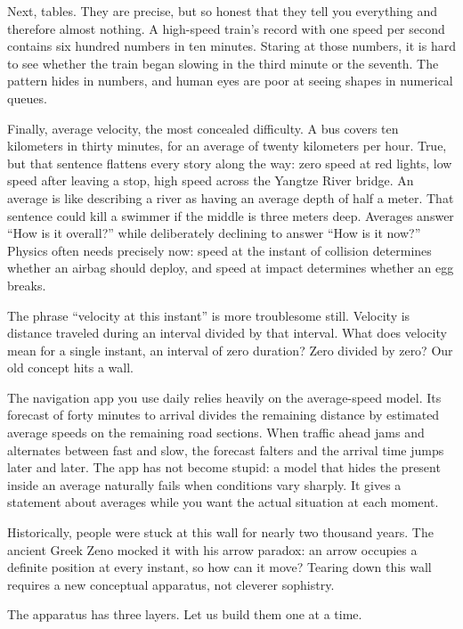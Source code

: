 Next, tables. They are precise, but so honest that they tell you everything and therefore almost nothing. A high-speed train's record with one speed per second contains six hundred numbers in ten minutes. Staring at those numbers, it is hard to see whether the train began slowing in the third minute or the seventh. The pattern hides in numbers, and human eyes are poor at seeing shapes in numerical queues.

Finally, average velocity, the most concealed difficulty. A bus covers ten kilometers in thirty minutes, for an average of twenty kilometers per hour. True, but that sentence flattens every story along the way: zero speed at red lights, low speed after leaving a stop, high speed across the Yangtze River bridge. An average is like describing a river as having an average depth of half a meter. That sentence could kill a swimmer if the middle is three meters deep. Averages answer ``How is it overall?'' while deliberately declining to answer ``How is it now?'' Physics often needs precisely now: speed at the instant of collision determines whether an airbag should deploy, and speed at impact determines whether an egg breaks.

The phrase ``velocity at this instant'' is more troublesome still. Velocity is distance traveled during an interval divided by that interval. What does velocity mean for a single instant, an interval of zero duration? Zero divided by zero? Our old concept hits a wall.

The navigation app you use daily relies heavily on the average-speed model. Its forecast of forty minutes to arrival divides the remaining distance by estimated average speeds on the remaining road sections. When traffic ahead jams and alternates between fast and slow, the forecast falters and the arrival time jumps later and later. The app has not become stupid: a model that hides the present inside an average naturally fails when conditions vary sharply. It gives a statement about averages while you want the actual situation at each moment.

Historically, people were stuck at this wall for nearly two thousand years. The ancient Greek Zeno mocked it with his arrow paradox: an arrow occupies a definite position at every instant, so how can it move? Tearing down this wall requires a new conceptual apparatus, not cleverer sophistry.


The apparatus has three layers. Let us build them one at a time.

